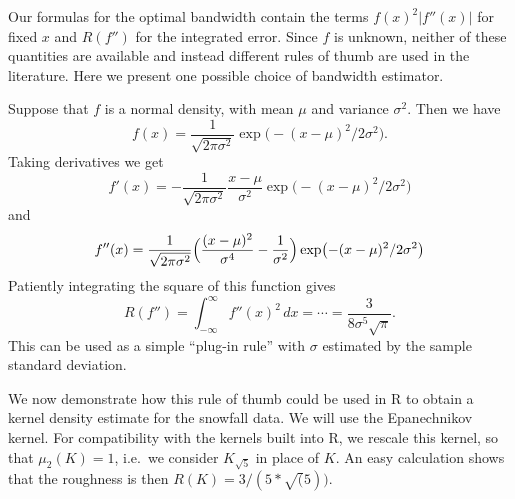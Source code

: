 \documentclass[
  a4paper,
]{article}
\theoremstyle{definition}
\theoremstyle{definition}
\theoremstyle{definition}
\theoremstyle{definition}
\theoremstyle{remark}
\begin{document}
Our formulas for the optimal bandwidth contain the terms
\(f(x)^2 |f''(x)|\) for fixed \(x\) and \(R(f'')\) for the integrated error.
Since \(f\) is unknown, neither of these quantities are available and instead
different rules of thumb are used in the literature. Here we present
one possible choice of bandwidth estimator.

Suppose that \(f\) is a normal density, with mean \(\mu\) and variance \(\sigma^2\).
Then we have
\begin{equation*}
  f(x)
  = \frac{1}{\sqrt{2\pi\sigma^2}} \exp\bigl( - (x-\mu)^2 / 2\sigma^2 \bigr).
\end{equation*}
Taking derivatives we get
\begin{equation*}
  f'(x)
  = - \frac{1}{\sqrt{2\pi\sigma^2}} \frac{x-\mu}{\sigma^2} \exp\bigl( - (x-\mu)^2 / 2\sigma^2 \bigr)
\end{equation*}
and
\begin{equation*}
  f''(x)
  = \frac{1}{\sqrt{2\pi\sigma^2}}
      \Bigl( \frac{(x-\mu)^2}{\sigma^4} - \frac{1}{\sigma^2} \Bigr)
      \exp\bigl( - (x-\mu)^2 / 2\sigma^2 \bigr)
\end{equation*}
Patiently integrating the square of this function gives
\begin{equation*}
  R(f'')
  = \int_{-\infty}^\infty f''(x)^2 \,dx
  = \cdots
  = \frac{3}{8\sigma^5\sqrt{\pi}}.
\end{equation*}
This can be used as a simple ``plug-in rule'' with \(\sigma\) estimated by the
sample standard deviation.

We now demonstrate how this rule of thumb could be used in R to obtain a kernel
density estimate for the snowfall data. We will use the Epanechnikov kernel.
For compatibility with the kernels built into R, we rescale this kernel, so
that \(\mu_2(K) = 1\), i.e.~we consider \(K_{\sqrt{5}}\) in place of \(K\). An easy
calculation shows that the roughness is then \(R(K) = 3 / (5*\sqrt(5))\).
\end{document}
